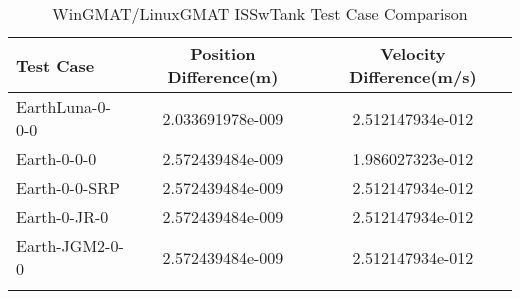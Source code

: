 \begin{table}[htbp!]
\centering
\caption{ WinGMAT/LinuxGMAT ISSwTank Test Case Comparison}
      \begin{tabular}{lcc}
      \hline\hline
          Test Case & Position Difference(m) & Velocity Difference(m/s) \\
         \hline
         EarthLuna-0-0-0 & 2.033691978e-009 & 2.512147934e-012 \\
         Earth-0-0-0 & 2.572439484e-009 & 1.986027323e-012 \\
         Earth-0-0-SRP & 2.572439484e-009 & 2.512147934e-012 \\
         Earth-0-JR-0 & 2.572439484e-009 & 2.512147934e-012 \\
         Earth-JGM2-0-0 & 2.572439484e-009 & 2.512147934e-012 \\
      \hline\hline
      \label{Table: ISSwTank WinGMAT-LinuxGMAT Table} 
\end{tabular}
\end{table}
